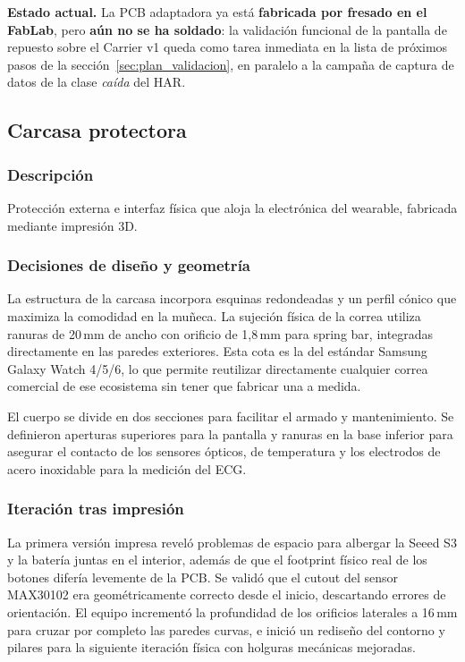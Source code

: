 \documentclass[letterpaper,11pt]{article}
\begin{document}
\textbf{Estado actual.} La PCB adaptadora ya está \textbf{fabricada por fresado en el FabLab}, pero \textbf{aún no se ha soldado}: la validación funcional de la pantalla de repuesto sobre el Carrier v1 queda como tarea inmediata en la lista de próximos pasos de la sección~\ref{sec:plan_validacion}, en paralelo a la campaña de captura de datos de la clase \textit{caída} del HAR.

\subsection{Carcasa protectora}

\subsubsection{Descripción}

Protección externa e interfaz física que aloja la electrónica del wearable, fabricada mediante impresión 3D.

\subsubsection{Decisiones de diseño y geometría}

La estructura de la carcasa incorpora esquinas redondeadas y un perfil cónico que maximiza la comodidad en la muñeca. La sujeción física de la correa utiliza ranuras de 20\,mm de ancho con orificio de 1,8\,mm para spring bar, integradas directamente en las paredes exteriores. Esta cota es la del estándar Samsung Galaxy Watch 4/5/6, lo que permite reutilizar directamente cualquier correa comercial de ese ecosistema sin tener que fabricar una a medida.

El cuerpo se divide en dos secciones para facilitar el armado y mantenimiento. Se definieron aperturas superiores para la pantalla y ranuras en la base inferior para asegurar el contacto de los sensores ópticos, de temperatura y los electrodos de acero inoxidable para la medición del ECG.

\subsubsection{Iteración tras impresión}

La primera versión impresa reveló problemas de espacio para albergar la Seeed S3 y la batería juntas en el interior, además de que el footprint físico real de los botones difería levemente de la PCB. Se validó que el cutout del sensor MAX30102 era geométricamente correcto desde el inicio, descartando errores de orientación. El equipo incrementó la profundidad de los orificios laterales a 16\,mm para cruzar por completo las paredes curvas, e inició un rediseño del contorno y pilares para la siguiente iteración física con holguras mecánicas mejoradas.
\end{document}
